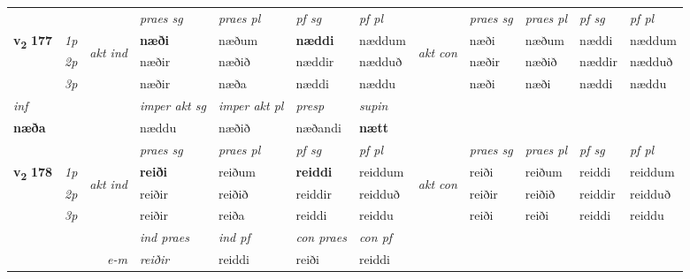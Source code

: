 \begin{longtable}[l]{X>{\footnotesize\itshape}llXXXXlXXXX}
 & &   & \textit{praes sg}  & \textit{praes pl}    & \textit{ pf sg} & \textit{pf pl} & & \textit{praes sg}  & \textit{praes pl}    & \textit{pf sg} & \textit{pf pl }  \\ \cmidrule{4-7} \cmidrule{9-12}
 \multirow{2}{*}{{{\textbf{v{\textsubscript{2}}} \Large{\textbf{177}}}}}  & 1p & \multirow{3}{*}{\begin{turn}{90}\textit{akt ind}\end{turn}} & \textbf{næði} & næðum & \textbf{næddi} & næddum & \multirow{3}{*}{\begin{turn}{90}\textit{akt con}\end{turn}} &næði & næðum & næddi & næddum\\*
 & 2p &  &  næðir  & næðið & næddir & nædduð & & næðir & næðið & næddir & nædduð \\*
 & 3p &  & næðir & næða & næddi & næddu & & næði & næði& næddi & næddu \\*
\cmidrule{4-7} \cmidrule{9-12}

   {\textit{inf}} & &  & \textit{imper akt sg} & \textit{imper akt pl}   & \textit{presp} & \textit{supin}   \\*
  {\textbf{næða}} & && næddu  & næðið   & næðandi &  \textbf{nætt}   \\*

\midrule

 & &   & \textit{praes sg}  & \textit{praes pl}    & \textit{ pf sg} & \textit{pf pl} & & \textit{praes sg}  & \textit{praes pl}    & \textit{pf sg} & \textit{pf pl }  \\ \cmidrule{4-7} \cmidrule{9-12}
 \multirow{2}{*}{{{\textbf{v{\textsubscript{2}}} \Large{\textbf{178}}}}}  & 1p & \multirow{3}{*}{\begin{turn}{90}\textit{akt ind}\end{turn}} & \textbf{reiði} & reiðum & \textbf{reiddi} & reiddum & \multirow{3}{*}{\begin{turn}{90}\textit{akt con}\end{turn}} &reiði & reiðum & reiddi & reiddum\\*
 & 2p &  &  reiðir  & reiðið & reiddir & reidduð & & reiðir & reiðið & reiddir & reidduð \\*
 & 3p &  & reiðir & reiða & reiddi & reiddu & & reiði & reiði& reiddi & reiddu \\*
\cmidrule{4-7} \cmidrule{9-12}

   && &  \textit{ind praes} & \textit{ind pf} & \textit{con praes} & \textit{con pf} \\*
\multicolumn{3}{r}{\textit{e-m}} & reiðir & reiddi & reiði & reiddi \\*


\end{longtable}
